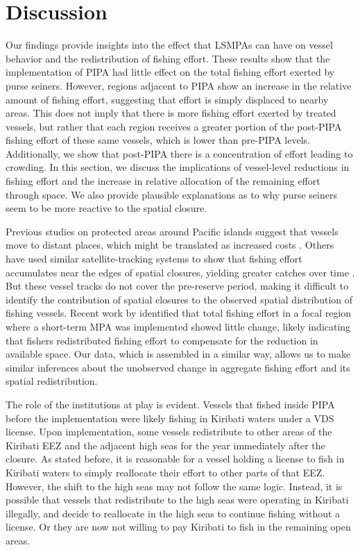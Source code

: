 \documentclass[11pt,english]{article}
\begin{document}
\clearpage


\section{Discussion}\label{discussion}

Our findings provide insights into the effect that LSMPAs
can have on vessel behavior and the redistribution of fishing effort.
These results show that the implementation of PIPA had
little effect on the total fishing effort exerted by purse seiners. However, regions
adjacent to PIPA show an increase in the relative amount of fishing
effort, suggesting that effort is simply displaced to nearby areas.
This does not imply that there is more fishing effort exerted by treated
vessels, but rather that each region receives a greater portion of the
post-PIPA fishing effort of these same vessels, which is lower than
pre-PIPA levels. Additionally, we show that post-PIPA there is a
concentration of effort leading to crowding. In this section, we discuss
the implications of vessel-level reductions in fishing effort and the
increase in relative allocation of the remaining effort through space.
We also provide plausible explanations as to why purse seiners seem to
be more reactive to the spatial closure.

Previous studies on protected areas around Pacific islands suggest that vessels move to
distant places, which might be translated as increased costs
\citep{stevenson_2013}. Others have used similar satellite-tracking systems to
show that fishing effort accumulates near the edges of spatial closures,
yielding greater catches over time \citep{murawski_2005}. But these vessel tracks
do not cover the pre-reserve period, making it difficult to identify the
contribution of spatial closures to the observed spatial distribution of
fishing vessels. Recent work by \citet{elahi_2018} identified that total
fishing effort in a focal region where a short-term MPA was implemented
showed little change, likely indicating that fishers redistributed
fishing effort to compensate for the reduction in available space. Our
data, which is assembled in a similar way, allows us to make similar
inferences about the unobserved change in aggregate fishing effort and
its spatial redistribution.

The role of the institutions at play is evident. Vessels that fished
inside PIPA before the implementation were likely fishing in
Kiribati waters under a VDS license. Upon implementation,
some vessels redistribute to other areas of the Kiribati EEZ and the adjacent
high seas for the year immediately after the closure. As stated before,
it is reasonable for a vessel holding a license to fish in Kiribati
waters to simply reallocate their effort to other parts of that EEZ.
However, the shift to the high seas may not follow the same logic.
Instead, it is possible that vessels that redistribute to the high seas
were operating in Kiribati illegally, and decide to reallocate in the
high seas to continue fishing without a license. Or they are now not willing to pay Kiribati to fish in the remaining open areas.
\end{document}
